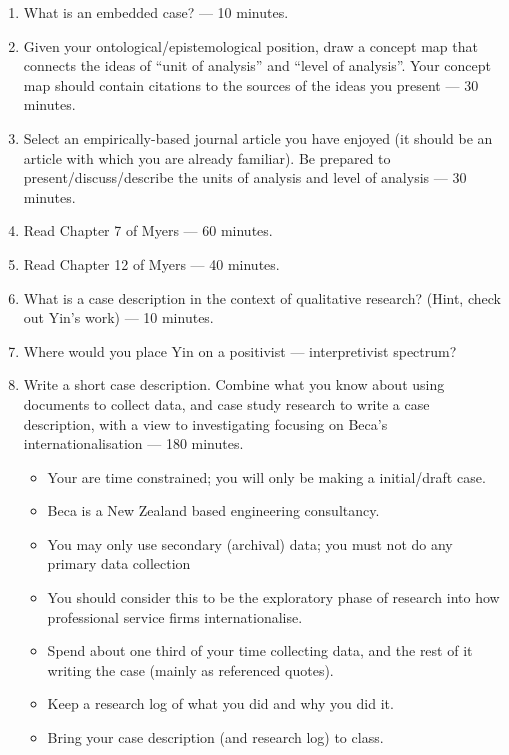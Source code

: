 \documentclass[]{book}
\providecommand{\tightlist}{%
  \setlength{\itemsep}{0pt}\setlength{\parskip}{0pt}}
\theoremstyle{definition}
\theoremstyle{definition}
\theoremstyle{definition}
\theoremstyle{remark}
\begin{document}
\begin{enumerate}
\def\labelenumi{\arabic{enumi}.}
\item
  What is an embedded case? --- 10 minutes.
\item
  Given your ontological/epistemological position, draw a concept map
  that connects the ideas of ``unit of analysis'' and ``level of
  analysis''. Your concept map should contain citations to the sources
  of the ideas you present --- 30 minutes.
\item
  Select an empirically-based journal article you have enjoyed (it
  should be an article with which you are already familiar). Be prepared
  to present/discuss/describe the units of analysis and level of
  analysis --- 30 minutes.
\item
  Read Chapter 7 of Myers \autocite*[
  p.~73--91]{myers_2013_qualitativeresearchbusiness} --- 60 minutes.
\item
  Read Chapter 12 of Myers \autocite*[
  p.~151--162]{myers_2013_qualitativeresearchbusiness} --- 40 minutes.
\item
  What is a case description in the context of qualitative research?
  (Hint, check out Yin's work) --- 10 minutes.
\item
  Where would you place Yin on a positivist --- interpretivist spectrum?
\item
  Write a short case description. Combine what you know about using
  documents to collect data, and case study research to write a case
  description, with a view to investigating focusing on Beca's
  internationalisation --- 180 minutes.

  \begin{itemize}
  \tightlist
  \item
    Your are time constrained; you will only be making a initial/draft
    case.
  \item
    Beca is a New Zealand based engineering consultancy.
  \item
    You may only use secondary (archival) data; you must not do any
    primary data collection
  \item
    You should consider this to be the exploratory phase of research
    into how professional service firms internationalise.
  \item
    Spend about one third of your time collecting data, and the rest of
    it writing the case (mainly as referenced quotes).
  \item
    Keep a research log of what you did and why you did it.
  \item
    Bring your case description (and research log) to class.
  \end{itemize}
\end{enumerate}
\end{document}
